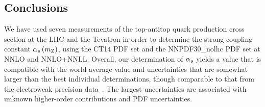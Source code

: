 \subsection{Conclusions}
% 
We have used seven measurements of the top-antitop quark production cross section
at the LHC and the Tevatron in order to determine the strong coupling constant $\alpha_s \left( m_\mathrm{Z} \right) $,
using the CT14 PDF set and the NNPDF30\_nolhc PDF set at NNLO and NNLO+NNLL.
% 
Overall, our determination of $\alpha_s$ yields a value that is compatible
with the world average value and uncertainties that are somewhat larger
than the best individual determinations, though comparable to that
from the electroweak precision data~\cite{Baak:2014ora}.
%
The largest uncertainties are associated with unknown higher-order
contributions and PDF uncertainties.
